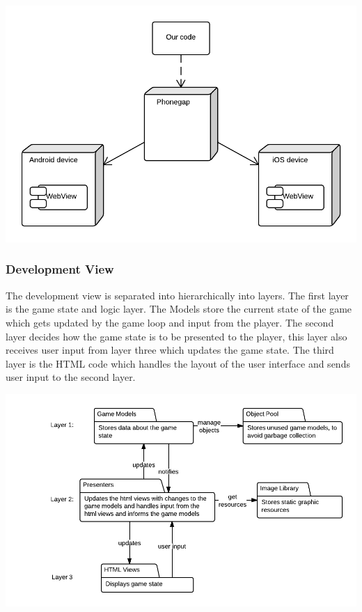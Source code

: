 \includegraphics[width=\textwidth]{pictures/deployment_diagram}

\subsubsection*{Development View}

The development view is separated into hierarchically into layers. The first layer is the game state 
and logic layer. The Models store the current state of the game which gets updated by the game loop 
and input from the player. The second layer decides how the game state is to be presented to the 
player, this layer also receives user input from layer three which updates the game state. The third 
layer is the HTML code which handles the layout of the user interface and sends user input to the
second layer.

\includegraphics[width=\textwidth]{pictures/development_view}
